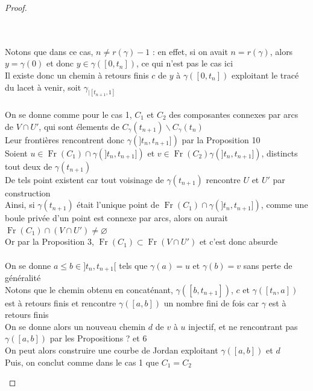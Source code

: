 \documentclass{article}
\begin{document}
\begin{flushleft}
\begin{proof}
\begin{itemize}
        \\~\\
        Notons que dans ce cas, $n \neq r(\gamma)-1$ : en effet, si on avait $n = r(\gamma)$, alors $y = \gamma(0)$
        et donc $y \in \gamma([0, t_n])$, ce qui n'est pas le cas ici\\
        Il existe donc un chemin à retours finis $c$ de $y$ à $\gamma([0, t_n])$ exploitant le tracé du lacet à venir, soit
        $\gamma_{\mid [t_{n+1}, 1]}$
        \\~\\
        On se donne comme pour le cas 1, $C_1$ et $C_2$ des composantes connexes par arcs de $V \cap U'$,
        qui sont élements de $C_{\gamma}(t_{n+1})\backslash C_{\gamma}(t_n)$\\
        Leur frontières rencontrent donc $\gamma(]t_n, t_{n+1}])$ par la Proposition 10\\
        Soient $u \in \operatorname{Fr}(C_1) \cap \gamma(]t_n, t_{n+1}])$ et
        $v \in \operatorname{Fr}(C_2) \gamma(]t_n, t_{n+1}])$, distincts tout deux de $\gamma(t_{n+1})$\\
        De tels point existent car tout voisinage de $\gamma(t_{n+1})$ rencontre $U$ et $U'$ par construction\\
        Ainsi, si $\gamma(t_{n+1})$ était l'unique point de $\operatorname{Fr}(C_1) \cap \gamma(]t_n, t_{n+1}])$, comme une boule privée
        d'un point est connexe par arcs, alors on aurait $\operatorname{Fr}(C_1) \cap (V \cap U') \neq \varnothing$\\
        Or par la Proposition 3, $\operatorname{Fr}(C_1) \subset \operatorname{Fr}(V \cap U')$ et c'est donc absurde
        \\~\\ 
        On se donne $a \leq b \in ]t_n, t_{n+1}[$ tels que $\gamma(a) = u$ et $\gamma(b) = v$ sans perte de généralité\\
        Notons que le chemin obtenu en concaténant, $\gamma([b, t_{n+1}])$, $c$ et $\gamma([t_n, a])$ est à retours finis
        et rencontre $\gamma([a, b])$ un nombre fini de fois car $\gamma$ est à retours finis\\
        On se donne alors un nouveau chemin $d$ de $v$ à $u$ injectif, et ne rencontrant pas $\gamma([a, b])$ par les Propositions ? et 6\\
        On peut alors construire une courbe de Jordan exploitant $\gamma([a, b])$ et $d$\\
        Puis, on conclut comme dans le cas 1 que $C_1 = C_2$

\end{itemize}
\end{proof}
\end{flushleft}
\end{document}
